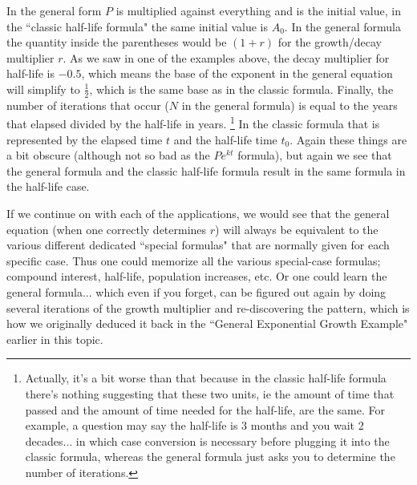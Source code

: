 \documentclass{ximeraXloud}
\begin{document}
        In the general form $P$ is multiplied against everything and is the initial value, in the ``classic half-life formula" the same initial value is $A_0$. In the general formula the quantity inside the parentheses would be $(1 + r)$ for the growth/decay multiplier $r$. As we saw in one of the examples above, the decay multiplier for half-life is $-0.5$, which means the base of the exponent in the general equation will simplify to $\frac{1}{2}$, which is the same base as in the classic formula. Finally, the number of iterations that occur ($N$ in the general formula) is equal to the years that elapsed divided by the half-life in years.%
        \footnote{
            Actually, it's a bit worse than that because in the classic half-life formula there's nothing suggesting that these two units, ie the amount of time that passed and the amount of time needed for the half-life, are the same. For example, a question may say the half-life is 3 months and you wait 2 decades... in which case conversion is necessary before plugging it into the classic formula, whereas the general formula just asks you to determine the number of iterations.
            }
        In the classic formula that is represented by the elapsed time $t$ and the half-life time $t_0$. Again these things are a bit obscure (although not so bad as the $Pe^{kt}$ formula), but again we see that the general formula and the classic half-life formula result in the same formula in the half-life case.
        
        If we continue on with each of the applications, we would see that the general equation (when one correctly determines $r$) will always be equivalent to the various different dedicated ``special formulas" that are normally given for each specific case. Thus one could memorize all the various special-case formulas; compound interest, half-life, population increases, etc. Or one could learn the general formula... which even if you forget, can be figured out again by doing several iterations of the growth multiplier and re-discovering the pattern, which is how we originally deduced it back in the ``General Exponential Growth Example" earlier in this topic.

%
\end{document}
